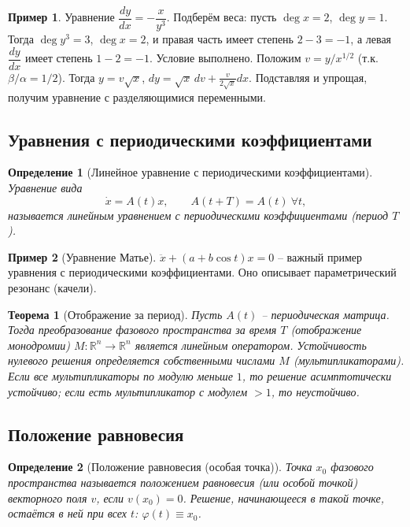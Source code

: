 \documentclass[a4paper,12pt]{article}
\newtheorem{definition}{Определение}
\newtheorem{theorem}{Теорема}
\theoremstyle{definition}
\newtheorem{example}{Пример}
\begin{document}
\begin{example}
	Уравнение $\dfrac{dy}{dx}=-\dfrac{x}{y^3}$.
	Подберём веса: пусть $\deg x=2$, $\deg y=1$. Тогда $\deg y^3=3$, $\deg x=2$, и правая часть имеет степень $2-3=-1$, а левая $\dfrac{dy}{dx}$ имеет степень $1-2=-1$. Условие выполнено.
	Положим $v=y/x^{1/2}$ (т.к. $\beta/\alpha=1/2$). Тогда $y=v\sqrt{x}$, $dy=\sqrt{x}\,dv+\frac{v}{2\sqrt{x}}dx$. Подставляя и упрощая, получим уравнение с разделяющимися переменными.
\end{example}

\subsection{Уравнения с периодическими коэффициентами}

\begin{definition}[Линейное уравнение с периодическими коэффициентами]
	Уравнение вида
	\[
	\dot{x}=A(t)x,\qquad A(t+T)=A(t)\ \forall t,
	\]
	называется \emph{линейным уравнением с периодическими коэффициентами} (период $T$).
\end{definition}

\begin{example}[Уравнение Матье]
	$\ddot{x}+(a+b\cos t)x=0$ – важный пример уравнения с периодическими коэффициентами. Оно описывает параметрический резонанс (качели).
\end{example}

\begin{theorem}[Отображение за период]
	Пусть $A(t)$ – периодическая матрица. Тогда преобразование фазового пространства за время $T$ (отображение монодромии) $M:\mathbb{R}^n\to\mathbb{R}^n$ является линейным оператором. Устойчивость нулевого решения определяется собственными числами $M$ (мультипликаторами). Если все мультипликаторы по модулю меньше $1$, то решение асимптотически устойчиво; если есть мультипликатор с модулем $>1$, то неустойчиво.
\end{theorem}

\subsection{Положение равновесия}

\begin{definition}[Положение равновесия (особая точка)]
	Точка $x_0$ фазового пространства называется \emph{положением равновесия} (или \emph{особой точкой}) векторного поля $v$, если $v(x_0)=0$. Решение, начинающееся в такой точке, остаётся в ней при всех $t$: $\varphi(t)\equiv x_0$.
\end{definition}
\end{document}

